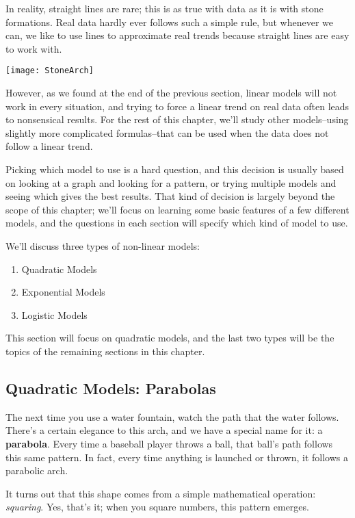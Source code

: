\setcounter{ExampleCounter}{1}
In reality, straight lines are rare; this is as true with data as it is with stone formations.  Real data hardly ever follows such a simple rule, but whenever we can, we like to use lines to approximate real trends because straight lines are easy to work with.

\begin{center}
\texttt{[image: StoneArch]}
\end{center}

However, as we found at the end of the previous section, linear models will not work in every situation, and trying to force a linear trend on real data often leads to nonsensical results.  For the rest of this chapter, we'll study other models--using slightly more complicated formulas--that can be used when the data does not follow a linear trend.

Picking which model to use is a hard question, and this decision is usually based on looking at a graph and looking for a pattern, or trying multiple models and seeing which gives the best results.  That kind of decision is largely beyond the scope of this chapter; we'll focus on learning some basic features of a few different models, and the questions in each section will specify which kind of model to use.

We'll discuss three types of non-linear models:
\begin{enumerate}
\item Quadratic Models
\item Exponential Models
\item Logistic Models
\end{enumerate}

This section will focus on quadratic models, and the last two types will be the topics of the remaining sections in this chapter.

\subsection{Quadratic Models: Parabolas}
The next time you use a water fountain, watch the path that the water follows.  There's a certain elegance to this arch, and we have a special name for it: a \textbf{parabola}.  Every time a baseball player throws a ball, that ball's path follows this same pattern.  In fact, every time anything is launched or thrown, it follows a parabolic arch.

It turns out that this shape comes from a simple mathematical operation: \emph{squaring}.  Yes, that's it; when you square numbers, this pattern emerges.

